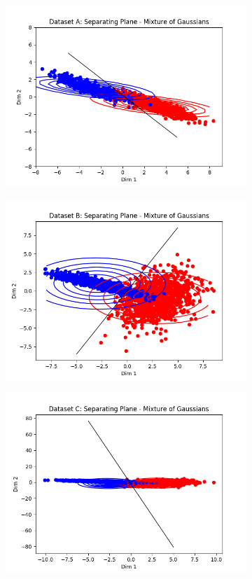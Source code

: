 \documentclass[paper=a4, fontsize=11pt]{scrartcl} %
\numberwithin{equation}{section} %
\numberwithin{figure}{section} %
\numberwithin{table}{section} %
\begin{document}
	\begin{figure}
	\begin{subfigure}{.5\textwidth}
		\centering
		\includegraphics[width=.9\linewidth]{img_A_MoG.png}
	\end{subfigure}
	\begin{subfigure}{.5\textwidth}
		\centering
		\includegraphics[width=.9\linewidth]{img_B_MoG.png}
	\end{subfigure}
	\begin{subfigure}{.5\textwidth}
		\centering
		\includegraphics[width=.9\linewidth]{img_C_MoG.png}

\end{subfigure}
\end{figure}
\end{document}
